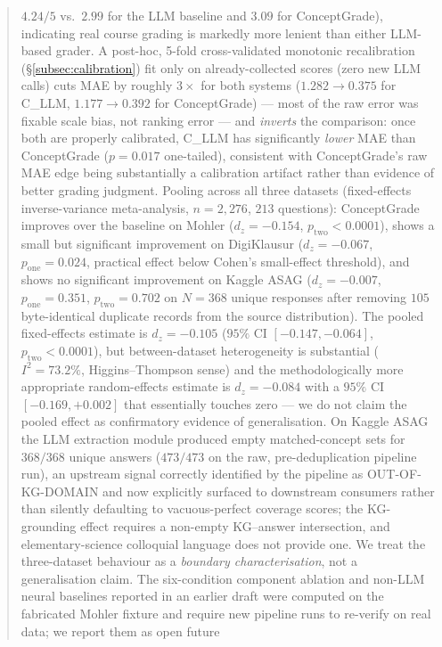 \documentclass[conference]{IEEEtran}
\begin{document}
\begin{abstract}
$4.24/5$ vs.\ $2.99$ for the LLM baseline and $3.09$ for ConceptGrade),
indicating real course grading is markedly more lenient than either
LLM-based grader. A post-hoc, 5-fold cross-validated monotonic
recalibration (\S\ref{subsec:calibration}) fit only on already-collected
scores (zero new LLM calls) cuts MAE by roughly $3\times$ for both
systems ($1.282\to0.375$ for C\_LLM, $1.177\to0.392$ for ConceptGrade)
--- most of the raw error was fixable scale bias, not ranking error ---
and \emph{inverts} the comparison: once both are properly calibrated,
C\_LLM has significantly \emph{lower} MAE than ConceptGrade
($p=0.017$ one-tailed), consistent with ConceptGrade's raw MAE edge
being substantially a calibration artifact rather than evidence of
better grading judgment. Pooling across all three datasets (fixed-effects
inverse-variance meta-analysis, $n=2{,}276$, $213$ questions):
ConceptGrade improves over the baseline on Mohler ($d_z = -0.154$,
$p_{\text{two}} < 0.0001$), shows a small but significant improvement on
DigiKlausur ($d_z = -0.067$, $p_{\text{one}} = 0.024$, practical effect below
Cohen's small-effect threshold), and shows no significant improvement on
Kaggle ASAG ($d_z = -0.007$, $p_{\text{one}} = 0.351$, $p_{\text{two}} = 0.702$
on $N = 368$ unique responses after removing $105$ byte-identical
duplicate records from the source distribution). The pooled fixed-effects
estimate is $d_z = -0.105$ ($95\%$ CI $[-0.147, -0.064]$,
$p_{\text{two}} < 0.0001$), but between-dataset heterogeneity is
substantial ($I^2 = 73.2\%$, Higgins--Thompson sense) and the
methodologically more appropriate random-effects estimate is
$d_z = -0.084$ with a $95\%$ CI $[-0.169, +0.002]$ that essentially
touches zero --- we do not claim the pooled effect as confirmatory
evidence of generalisation. On Kaggle ASAG the LLM
extraction module produced empty matched-concept sets for $368/368$
unique answers ($473/473$ on the raw, pre-deduplication pipeline run),
an upstream signal correctly identified by the pipeline as
OUT-OF-KG-DOMAIN and now explicitly surfaced to downstream consumers
rather than silently defaulting to vacuous-perfect coverage scores; the
KG-grounding effect requires a non-empty KG--answer intersection, and
elementary-science colloquial language does not provide one. We treat the three-dataset behaviour as a \emph{boundary
characterisation}, not a generalisation claim. The six-condition
component ablation and non-LLM neural baselines reported in an earlier
draft were computed on the fabricated Mohler fixture and require new
pipeline runs to re-verify on real data; we report them as open future

\end{abstract}
\end{document}
